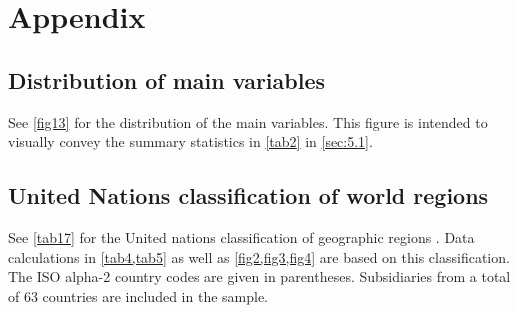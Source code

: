 \documentclass[10pt,twocolumn,oneside,cmyk]{article}
\begin{document}
\section{Appendix }\label{app:C}
\subsection{Distribution of main variables}\label{app:C1}
See \cref{fig13} for the distribution of the main variables. This figure is intended to visually convey the summary statistics in \cref{tab2} in \cref{sec:5.1}.

\subsection{United Nations classification of world regions}\label{app:C2}
See \cref{tab17} for the United nations classification of geographic regions \parencite{united_nations_methodology_2017}. Data calculations in \cref{tab4,tab5} as well as \cref{fig2,fig3,fig4} are based on this classification. The ISO alpha-2 country codes are given in parentheses. Subsidiaries from a total of 63 countries are included in the sample.
\end{document}
